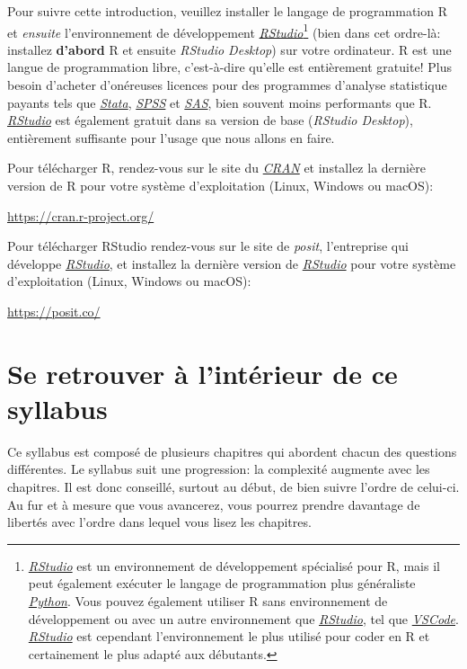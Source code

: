\documentclass[
]{book}
\begin{document}
Pour suivre cette introduction, veuillez installer le langage de programmation R et \emph{ensuite} l'environnement de développement \href{https://posit.co/}{\emph{RStudio}}\footnote{\href{https://posit.co/}{\emph{RStudio}} est un environnement de développement spécialisé pour R, mais il peut également exécuter le langage de programmation plus généraliste \href{https://www.python.org/}{\emph{Python}}. Vous pouvez également utiliser R sans environnement de développement ou avec un autre environnement que \href{https://posit.co/}{\emph{RStudio}}, tel que \href{https://code.visualstudio.com/}{\emph{VSCode}}. \href{https://posit.co/}{\emph{RStudio}} est cependant l'environnement le plus utilisé pour coder en R et certainement le plus adapté aux débutants.} (bien dans cet ordre-là: installez \textbf{d'abord} R et ensuite \emph{RStudio Desktop}) sur votre ordinateur. R est une langue de programmation libre, c'est-à-dire qu'elle est entièrement gratuite! Plus besoin d'acheter d'onéreuses licences pour des programmes d'analyse statistique payants tels que \href{https://www.stata.com/}{\emph{Stata}}, \href{https://www.ibm.com/fr-fr/products/spss-statistics}{\emph{SPSS}} et \href{https://www.sas.com/}{\emph{SAS}}, bien souvent moins performants que R. \href{https://posit.co/}{\emph{RStudio}} est également gratuit dans sa version de base (\emph{RStudio Desktop}), entièrement suffisante pour l'usage que nous allons en faire.

Pour télécharger R, rendez-vous sur le site du \href{https://cran.r-project.org/}{\emph{CRAN}} et installez la dernière version de R pour votre système d'exploitation (Linux, Windows ou macOS):

\url{https://cran.r-project.org/}

Pour télécharger RStudio rendez-vous sur le site de \emph{posit}, l'entreprise qui développe \href{https://posit.co/}{\emph{RStudio}}, et installez la dernière version de \href{https://posit.co/}{\emph{RStudio}} pour votre système d'exploitation (Linux, Windows ou macOS):

\url{https://posit.co/}

\hypertarget{se-retrouver-uxe0-lintuxe9rieur-de-ce-syllabus}{%
\section{Se retrouver à l'intérieur de ce syllabus}\label{se-retrouver-uxe0-lintuxe9rieur-de-ce-syllabus}}

Ce syllabus est composé de plusieurs chapitres qui abordent chacun des questions différentes. Le syllabus suit une progression: la complexité augmente avec les chapitres. Il est donc conseillé, surtout au début, de bien suivre l'ordre de celui-ci. Au fur et à mesure que vous avancerez, vous pourrez prendre davantage de libertés avec l'ordre dans lequel vous lisez les chapitres.
\end{document}
